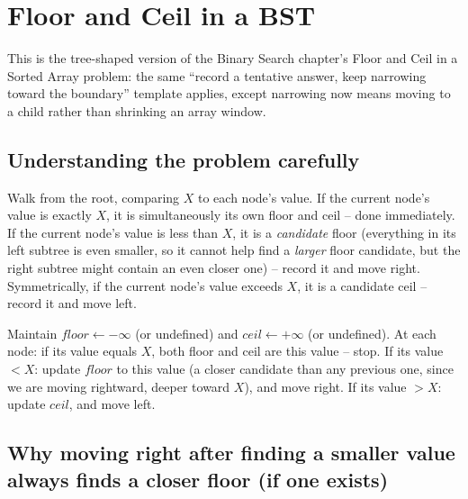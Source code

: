 \section{Floor and Ceil in a BST}
\label{sec:bst-floor-ceil}


\begin{patternbox}
This is the tree-shaped version of the Binary Search chapter's
Floor and Ceil in a Sorted Array problem: the same ``record a tentative answer, keep narrowing
toward the boundary'' template applies, except narrowing now means moving
to a child rather than shrinking an array window.
\end{patternbox}

\subsection*{Understanding the problem carefully}

Walk from the root, comparing $X$ to each node's value. If the current
node's value is exactly $X$, it is simultaneously its own floor and
ceil -- done immediately. If the current node's value is less than $X$,
it is a \emph{candidate} floor (everything in its left subtree is even
smaller, so it cannot help find a \emph{larger} floor candidate, but the
right subtree might contain an even closer one) -- record it and move
right. Symmetrically, if the current node's value exceeds $X$, it is a
candidate ceil -- record it and move left.

\begin{ideabox}
Maintain $\textit{floor} \gets -\infty$ (or undefined) and
$\textit{ceil} \gets +\infty$ (or undefined). At each node: if its value
equals $X$, both floor and ceil are this value -- stop. If its value $<
X$: update $\textit{floor}$ to this value (a closer candidate than any
previous one, since we are moving rightward, deeper toward $X$), and move
right. If its value $> X$: update $\textit{ceil}$, and move left.
\end{ideabox}

\subsection*{Why moving right after finding a smaller value always finds a closer floor (if one exists)}

